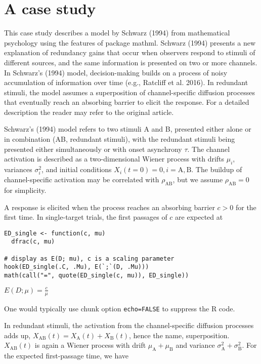 \hypertarget{a-case-study}{%
\section{A case study}\label{a-case-study}}

This case study describes a model by Schwarz (1994) from mathematical
psychology using the features of package mathml. Schwarz (1994) presents
a new explanation of redundancy gains that occur when observers respond
to stimuli of different sources, and the same information is presented
on two or more channels. In Schwarz's (1994) model, decision-making
builds on a process of noisy accumulation of information over time
(e.g., Ratcliff et al. 2016). In redundant stimuli, the model assumes a
superposition of channel-specific diffusion processes that eventually
reach an absorbing barrier to elicit the response. For a detailed
description the reader may refer to the original article.

Schwarz's (1994) model refers to two stimuli A and B, presented either
alone or in combination (AB, redundant stimuli), with the redundant
stimuli being presented either simultaneously or with onset asynchrony
\(\tau\). The channel activation is described as a two-dimensional Wiener
process with drifts \(\mu_i\), variances \(\sigma^2_i\), and initial
conditions \(X_i(t = 0) = 0, i = \mathrm{A, B}\). The buildup of
channel-specific activation may be correlated with \(\rho_{\mathrm{AB}}\),
but we assume \(\rho_{\mathrm{AB}} = 0\) for simplicity.

A response is elicited when the process reaches an absorbing barrier
\(c > 0\) for the first time. In single-target trials, the first passages
of \(c\) are expected at

\begin{verbatim}
ED_single <- function(c, mu)
  dfrac(c, mu)

# display as E(D; mu), c is a scaling parameter
hook(ED_single(.C, .Mu), E(`;`(D, .Mu)))
math(call("=", quote(ED_single(c, mu)), ED_single))
\end{verbatim}

\({E{\left({D}{;}{\mu}\right)}}{=}{\displaystyle{\frac{c}{\mu}}}\)

One would typically use chunk option \texttt{echo=FALSE} to suppress the R
code.

In redundant stimuli, the activation from the channel-specific diffusion
processes adds up,
\(X_{\mathrm{AB}}(t) = X_{\mathrm A}(t) + X_{\mathrm B}(t)\), hence the
name, superposition. \(X_{\mathrm{AB}}(t)\) is again a Wiener process with
drift \(\mu_{\mathrm A} + \mu_{\mathrm B}\) and variance
\(\sigma^2_{\mathrm A} + \sigma^2_{\mathrm B}\). For the expected
first-passage time, we have

